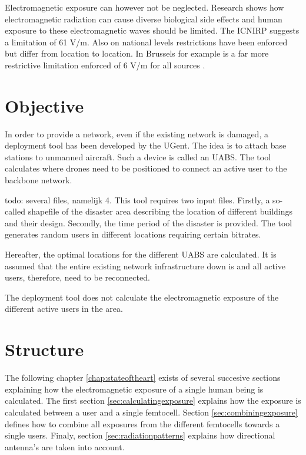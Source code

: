 Electromagnetic exposure can however not be neglected. Research shows how electromagnetic radiation can cause diverse biological side effects \cite{bioeffects} and human exposure to these electromagnetic waves should be limited. The \gls{ICNIRP} 
suggests a limitation of 61 V/m. Also on national levels restrictions have been enforced but differ from location to location. In Brussels for example is a far more restrictive limitation enforced of 6 V/m for all sources \cite{J1, J5}.
\section{Objective}
\label{sec:objective}

In order to provide a network, even if the existing network is damaged, a deployment tool has been developed by the UGent. The idea is to attach base stations to unmanned aircraft. Such a device is called an \gls{UABS}. The tool calculates where drones need to be positioned to connect an active user to the backbone network. 

todo: several files, namelijk 4.
This tool requires two input files. Firstly, a so-called shapefile of the disaster area describing the location of different buildings and their design. Secondly, the time period of the disaster is provided. The tool generates random users in different locations requiring certain bitrates.

Hereafter, the optimal locations for the different \gls{UABS} are calculated. It is assumed that the entire existing network infrastructure down is and all active users, therefore, need to be reconnected.

The deployment tool does not calculate the electromagnetic exposure of the different active users in the area.

\section{Structure}
\label{sec:structure}

The following chapter \ref{chap:stateoftheart} exists of several succesive sections explaining how the electromagnetic exposure of a single human being is calculated. The first section \ref{sec:calculatingexposure}
explains how the exposure is calculated between a user and a single femtocell. Section \ref{sec:combiningexposure}  defines how to combine all exposures from the different femtocells towards a single users.
Finaly, section \ref{sec:radiationpatterns} explains how directional antenna's are taken into account.

